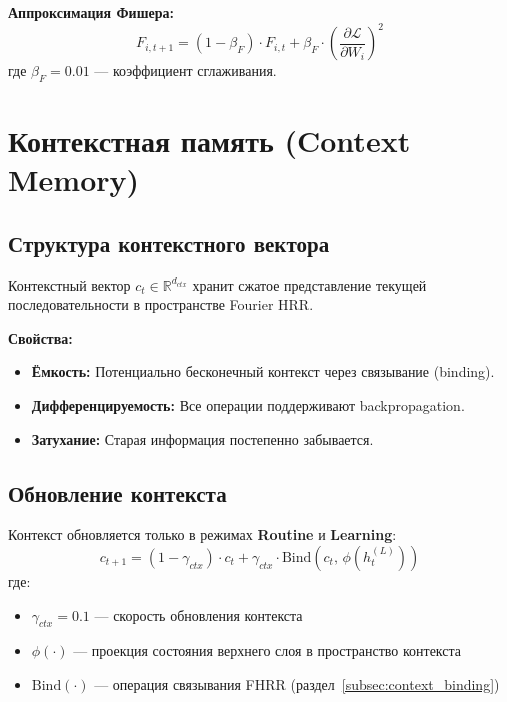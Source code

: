 \textbf{Аппроксимация Фишера:}
\begin{equation}
F_{i, t+1} = (1 - \beta_F) \cdot F_{i, t} + \beta_F \cdot \left(\frac{\partial \mathcal{L}}{\partial W_i}\right)^2
\label{eq:fisher}
\end{equation}
где $\beta_F = 0.01$ — коэффициент сглаживания.

\section{Контекстная память (Context Memory)}

\subsection{Структура контекстного вектора}

Контекстный вектор $c_t \in \mathbb{R}^{d_{ctx}}$ хранит сжатое представление текущей последовательности в пространстве Fourier HRR.

\textbf{Свойства:}
\begin{itemize}
    \item \textbf{Ёмкость:} Потенциально бесконечный контекст через связывание (binding).
    \item \textbf{Дифференцируемость:} Все операции поддерживают backpropagation.
    \item \textbf{Затухание:} Старая информация постепенно забывается.
\end{itemize}

\subsection{Обновление контекста}

Контекст обновляется только в режимах \textbf{Routine} и \textbf{Learning}:
\begin{equation}
c_{t+1} = (1 - \gamma_{ctx}) \cdot c_t + \gamma_{ctx} \cdot \text{Bind}(c_t, \, \phi(h_t^{(L)}))
\label{eq:context_update}
\end{equation}
где:
\begin{itemize}
    \item $\gamma_{ctx} = 0.1$ — скорость обновления контекста
    \item $\phi(\cdot)$ — проекция состояния верхнего слоя в пространство контекста
    \item $\text{Bind}(\cdot)$ — операция связывания FHRR (раздел~\ref{subsec:context_binding})
\end{itemize}

